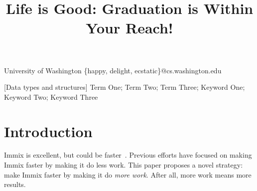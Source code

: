 \documentclass[10pt,preprint,numbers]{sigplanconf}
\begin{document}

\title{Life is Good: Graduation is Within Your Reach!}

           {University of Washington}
           {\{happy, delight, ecstatic\}@cs.washington.edu}

\maketitle



{\footnotesize
{}[Data
    types and structures]
\terms  %
Term One; Term Two; Term Three;
\keywords
Keyword One; Keyword Two; Keyword Three
}


\section{Introduction}

Immix is excellent, but could be faster~\citep{immix}. Previous efforts have
focused on making Immix faster by making it do less work. This paper proposes
a novel strategy: make Immix faster by making it do \emph{more work}. 
After all, more work means more results.



\end{document}
